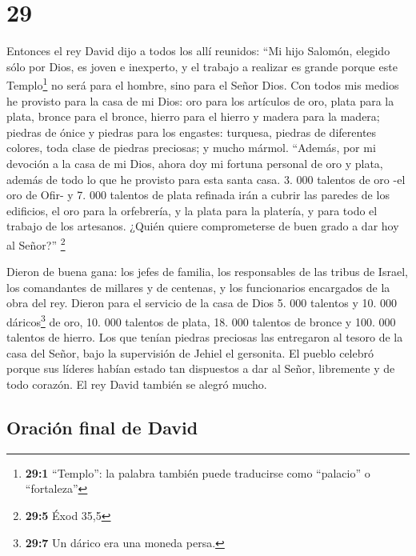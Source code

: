 \hypertarget{section-28}{%
\section{29}\label{section-28}}

 Entonces el rey David dijo a todos los allí reunidos:
``Mi hijo Salomón, elegido sólo por Dios, es joven e inexperto, y el
trabajo a realizar es grande porque este Templo\footnote{\textbf{29:1}
  ``Templo'': la palabra también puede traducirse como ``palacio'' o
  ``fortaleza''} no será para el hombre, sino para el Señor Dios.
 Con todos mis medios he provisto para la casa de mi Dios:
oro para los artículos de oro, plata para la plata, bronce para el
bronce, hierro para el hierro y madera para la madera; piedras de ónice
y piedras para los engastes: turquesa, piedras de diferentes colores,
toda clase de piedras preciosas; y mucho mármol. 
``Además, por mi devoción a la casa de mi Dios, ahora doy mi fortuna
personal de oro y plata, además de todo lo que he provisto para esta
santa casa.  3. 000 talentos de oro -el oro de Ofir- y 7.
000 talentos de plata refinada irán a cubrir las paredes de los
edificios,  el oro para la orfebrería, y la plata para la
platería, y para todo el trabajo de los artesanos. ¿Quién quiere
comprometerse de buen grado a dar hoy al Señor?'' \footnote{\textbf{29:5}
  Éxod 35,5}

 Dieron de buena gana: los jefes de familia, los
responsables de las tribus de Israel, los comandantes de millares y de
centenas, y los funcionarios encargados de la obra del rey.
 Dieron para el servicio de la casa de Dios 5. 000
talentos y 10. 000 dáricos\footnote{\textbf{29:7} Un dárico era una
  moneda persa.} de oro, 10. 000 talentos de plata, 18. 000 talentos de
bronce y 100. 000 talentos de hierro.  Los que tenían
piedras preciosas las entregaron al tesoro de la casa del Señor, bajo la
supervisión de Jehiel el gersonita.  El pueblo celebró
porque sus líderes habían estado tan dispuestos a dar al Señor,
libremente y de todo corazón. El rey David también se alegró mucho.

\hypertarget{oraciuxf3n-final-de-david}{%
\subsection{Oración final de David}\label{oraciuxf3n-final-de-david}}

